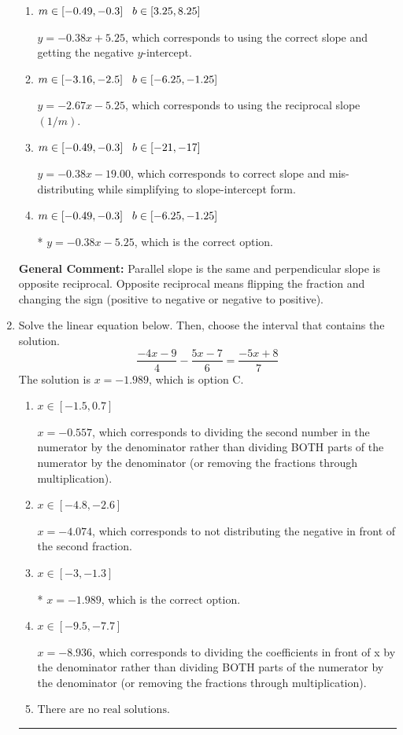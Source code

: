 \documentclass{extbook}[14pt]
\newcommand{\litem}[1]{\item #1

\rule{\textwidth}{0.4pt}}
\begin{document}
\begin{enumerate}
{\begin{enumerate}[label=\Alph*.]
 $y = 0.38x - 12.75$, which corresponds to using the negative slope.
\item \( m \in [-0.49, -0.3] \hspace*{3mm} b \in [3.25, 8.25] \)

 $y = -0.38x + 5.25$, which corresponds to using the correct slope and getting the negative $y$-intercept.
\item \( m \in [-3.16, -2.5] \hspace*{3mm} b \in [-6.25, -1.25] \)

 $y = -2.67x - 5.25$, which corresponds to using the reciprocal slope $(1/m)$.
\item \( m \in [-0.49, -0.3] \hspace*{3mm} b \in [-21, -17] \)

 $y = -0.38x - 19.00$, which corresponds to correct slope and mis-distributing while simplifying to slope-intercept form.
\item \( m \in [-0.49, -0.3] \hspace*{3mm} b \in [-6.25, -1.25] \)

* $y = -0.38x - 5.25$, which is the correct option.
\end{enumerate}

\textbf{General Comment:} Parallel slope is the same and perpendicular slope is opposite reciprocal. Opposite reciprocal means flipping the fraction and changing the sign (positive to negative or negative to positive).
}
\litem{
Solve the linear equation below. Then, choose the interval that contains the solution.
\[ \frac{-4x -9}{4} - \frac{5x -7}{6} = \frac{-5x + 8}{7} \]The solution is \( x = -1.989 \), which is option C.\begin{enumerate}[label=\Alph*.]
\item \( x \in [-1.5, 0.7] \)

 $x = -0.557$, which corresponds to dividing the second number in the numerator by the denominator rather than dividing BOTH parts of the numerator by the denominator (or removing the fractions through multiplication).
\item \( x \in [-4.8, -2.6] \)

 $x = -4.074$, which corresponds to not distributing the negative in front of the second fraction.
\item \( x \in [-3, -1.3] \)

* $x = -1.989$, which is the correct option.
\item \( x \in [-9.5, -7.7] \)

 $x = -8.936$, which corresponds to dividing the coefficients in front of x by the denominator rather than dividing BOTH parts of the numerator by the denominator (or removing the fractions through multiplication).
\item \( \text{There are no real solutions.} \)


\end{enumerate}}
\end{enumerate}
\end{document}
